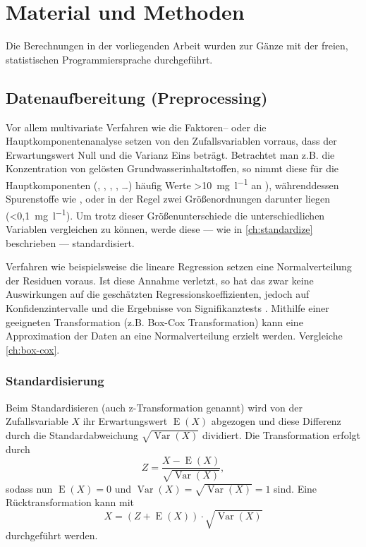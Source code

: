 \chapter{Material und Methoden}\label{ch:mm} 
Die Berechnungen in der vorliegenden Arbeit wurden zur Gänze mit der freien, statistischen Programmiersprache \R{} \citep{rbase} durchgeführt. 

\section{Datenaufbereitung (Preprocessing)}
Vor allem multivariate Verfahren wie die Faktoren-- oder die Hauptkomponentenanalyse setzen von den Zufallsvariablen vorraus, dass der Erwartungswert Null und die Varianz Eins beträgt. Betrachtet man z.B. die Konzentration von gelösten Grundwasserinhaltstoffen, so nimmt diese für die Hauptkomponenten (, , , , \ldots) häufig Werte \SI{>10}{\milli\gram\per\litre} an \citep{huetter}), währenddessen Spurenstoffe wie ,  oder  in der Regel zwei Größenordnungen darunter liegen (\SI{<0,1}{\milli\gram\per\litre}). Um trotz dieser Größenunterschiede die unterschiedlichen Variablen vergleichen zu können, werde diese --- wie in \autoref{ch:standardize} beschrieben --- standardisiert.

Verfahren wie beispielsweise die lineare Regression setzen eine Normalverteilung der Residuen voraus. Ist diese Annahme verletzt, so hat das zwar keine Auswirkungen auf die geschätzten Regressionskoeffizienten, jedoch auf Konfidenzintervalle und die Ergebnisse von Signifikanztests \citep{albers}. Mithilfe einer geeigneten Transformation (z.B. Box-Cox Transformation) kann eine Approximation der Daten an eine Normalverteilung erzielt werden. Vergleiche \autoref{ch:box-cox}. 

\subsection{Standardisierung}
\label{ch:standardize}
Beim Standardisieren (auch z-Transformation genannt) wird von der Zufallsvariable $X$ ihr Erwartungswert $\operatorname{E}(X)$ abgezogen und diese Differenz durch die Standardabweichung $\sqrt{\operatorname{Var}(X)}$ dividiert. Die Transformation erfolgt durch 
\begin{equation}
  Z=\frac{X-\operatorname{E}(X)}{\sqrt{\operatorname{Var}(X)}}, 
\end{equation}
sodass nun $\operatorname{E}(X)=0$ und $\operatorname{Var}(X)=\sqrt{\operatorname{Var}(X)}=1$ sind. Eine Rücktransformation kann mit 
\begin{equation*}
  X=\left(Z+\operatorname{E}(X)\right) \cdot\sqrt{\operatorname{Var}(X)}
\end{equation*} 
durchgeführt werden. 

